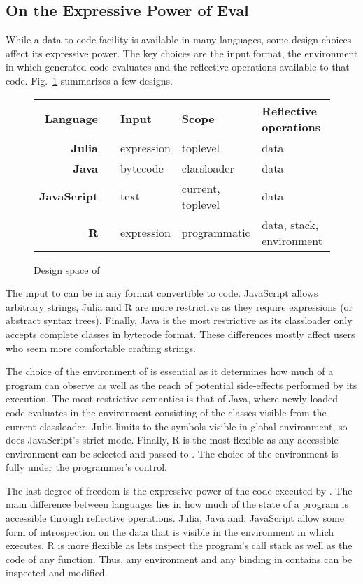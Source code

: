\documentclass[screen,acmsmall]{acmart}%
\begin{document}
\subsection{On the Expressive Power of Eval}

While a data-to-code facility is available in many languages, some design
choices affect its expressive power. The key choices are the input format, the
environment in which generated code evaluates and the reflective operations
available to that code. Fig.~\ref{comp} summarizes a few designs.

\begin{figure}[!h]\center\small\begin{tabular}{r@{~}llll}\toprule
\tiny\sc Language&&\sc\tiny Input&\sc\tiny Scope&\tiny\sc Reflective operations\\\midrule
\bf Julia&\cite{julia}     & expression& toplevel         & data\\
\bf Java&\cite{cl}  & bytecode  & classloader       & data\\
\bf JavaScript&\cite{ecoop11}& text      & current, toplevel& data\\
\bf R&\cite{R96}  & expression& programmatic      & data, stack, environment\\\bottomrule
\end{tabular}\caption{Design space of \eval}\label{comp}
\end{figure}

The input to \eval can be in any format convertible to code. JavaScript allows
arbitrary strings, Julia and R are more restrictive as they require expressions
(or abstract syntax trees). Finally, Java is the most restrictive as its
classloader only accepts complete classes in bytecode format. These differences
mostly affect users who seem more comfortable crafting strings.

The choice of the environment of \eval is essential as it determines how much of
a program \eval can observe as well as the reach of potential side-effects
performed by its execution. The most restrictive semantics is that of Java,
where newly loaded code evaluates in the environment consisting of the classes
visible from the current classloader. Julia limits \eval to the symbols visible
in global environment, so does JavaScript's strict mode. Finally, R is the most
flexible as any accessible environment can be selected and passed to \eval. The
choice of the environment is fully under the programmer's control.

The last degree of freedom is the expressive power of the code executed by
\eval. The main difference between languages lies in how much of the state of a
program is accessible through reflective operations. Julia, Java and, JavaScript
allow some form of introspection on the data that is visible in the environment
in which \eval executes. R is more flexible as lets \eval inspect the program's
call stack as well as the code of any function. Thus, any environment and any
binding in contains can be inspected and modified.
\end{document}
